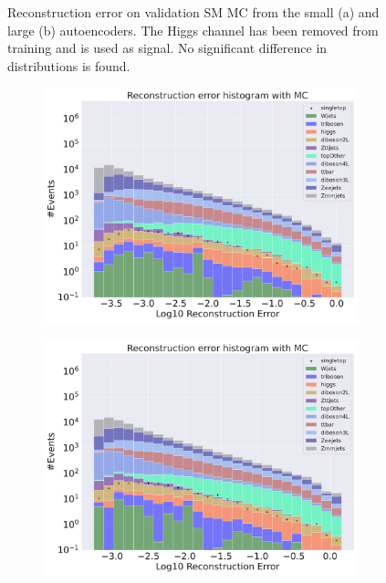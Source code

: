 \begin{figure}[H]
\begin{subfigure}{.45\textwidth}
        \caption{ }
        \label{fig:ae_big_higgs}
    \end{subfigure}
    \hfill 
    \caption[AE | Reconstruction error using Higgs channel as signal]{Reconstruction error on validation SM MC from the small (a) and large (b) autoencoders. The Higgs channel has been removed from training and 
    is used as signal. No significant difference in distributions is found.  } 
    \label{fig:ae_big_channel_1}
    
\end{figure}

\begin{figure}[H]
    \centering
    \begin{subfigure}{.45\textwidth}
        \includegraphics[width=\textwidth]{Figures/AE_testing/small/b_data_recon_big_rm3_feats_sig_singletop.pdf}
        \caption{}
        \label{fig:ae_small_singletop}
    \end{subfigure}
    \hfill
    \begin{subfigure}{.45\textwidth}
        \includegraphics[width=\textwidth]{Figures/AE_testing/big/b_data_recon_big_rm3_feats_sig_singletop.pdf}

\end{subfigure}
\end{figure}
